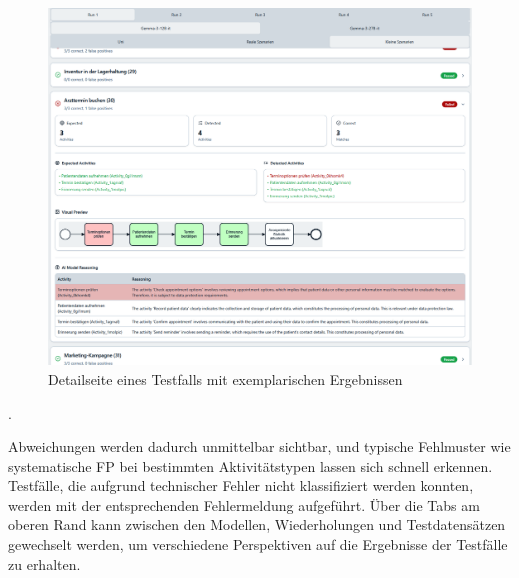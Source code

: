 \begin{figure}[h]
    \centering
    \includegraphics[width=\textwidth]{images/evaluation/evaluation-result-by-testcase_new}
    \caption{Detailseite eines Testfalls mit exemplarischen Ergebnissen}
    \label{fig:evaluation-by-testcase}
\end{figure}.

Abweichungen werden dadurch unmittelbar sichtbar, und typische Fehlmuster wie systematische \ac{FP} bei bestimmten Aktivitätstypen lassen sich schnell erkennen. Testfälle, die aufgrund technischer Fehler nicht klassifiziert werden konnten, werden mit der entsprechenden Fehlermeldung aufgeführt. Über die Tabs am oberen Rand kann zwischen den Modellen, Wiederholungen und Testdatensätzen gewechselt werden, um verschiedene Perspektiven auf die Ergebnisse der Testfälle zu erhalten.
